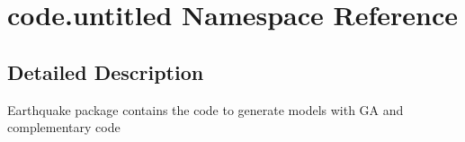 \hypertarget{namespacecode_1_1untitled}{}\section{code.\+untitled Namespace Reference}
\label{namespacecode_1_1untitled}


\subsection{Detailed Description}
\begin{DoxyVerb}Earthquake package contains the code to generate models with GA and complementary code
\end{DoxyVerb}
 